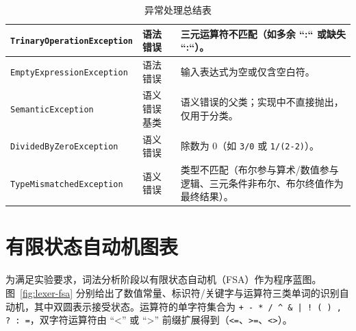 \begin{table}[htbp]
\begin{tabular}{|p{6.3cm}|p{3cm}|p{5cm}|}
    \hline
    \texttt{TrinaryOperationException} & 语法错误 & 三元运算符不匹配（如多余 ``:`` 或缺失 ``:``）。 \\
    \hline
    \texttt{EmptyExpressionException} & 语法错误 & 输入表达式为空或仅含空白符。 \\
    \hline
    \texttt{SemanticException} & 语义错误基类 & 语义错误的父类；实现中不直接抛出，仅用于分类。 \\
    \hline
    \texttt{DividedByZeroException} & 语义错误 & 除数为 0（如 \texttt{3/0} 或 \texttt{1/(2-2)}）。 \\
    \hline
    \texttt{TypeMismatchedException} & 语义错误 & 类型不匹配（布尔参与算术/数值参与逻辑、三元条件非布尔、布尔终值作为最终结果）。 \\
    \hline
    \end{tabular}
    \caption{异常处理总结表}
    \label{tab:exception-summary}
\end{table}

\section{有限状态自动机图表}
为满足实验要求，词法分析阶段以有限状态自动机（FSA）作为程序蓝图。图~\ref{fig:lexer-fsa} 分别给出了数值常量、标识符/关键字与运算符三类单词的识别自动机，其中双圆表示接受状态。运算符的单字符集合为 \texttt{+ - * / \^{} \& | ! ( ) , ? : =}，双字符运算符由 ``<'' 或 ``>'' 前缀扩展得到（\texttt{<=}、\texttt{>=}、\texttt{<>}）。

